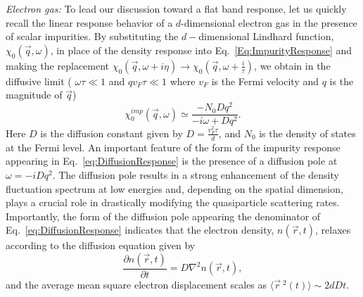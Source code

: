 \documentclass[prl,aps,twocolumn,groupaddress]{revtex4-1}
\begin{document}
\textit{Electron gas:} To lead our discussion toward a flat band response, let us quickly recall the linear response behavior of a $d$-dimensional electron gas in the presence of scalar impurities. By substituting the $d-$dimensional Lindhard function, $\chi_0(\vec q, \omega)$, in place of the density response into Eq.~\ref{Eq:ImpurityResponse} and making the replacement $\chi_0(\vec q, \omega + i\eta) \rightarrow \chi_0(\vec q, \omega + \frac{i}{\tau})$, we obtain in the diffusive limit ( $\omega \tau\ll 1$ and $qv_F \tau \ll 1$ where $v_F$ is the Fermi velocity and $q$ is the magnitude of $\vec q$)~\cite{rammer2004quantum}
\begin{equation}
\chi^{imp}_0(\vec q, \omega) \simeq \frac{-N_0 D q^2}{ - i \omega + D q^2}.
\label{eq:DiffusionResponse}
\end{equation}
Here $D$ is the diffusion constant given by $D = \frac{v_F^2 \tau}{d}$, and $N_0$ is the density of states at the Fermi level. An important feature of the form of the impurity response appearing in Eq.~\ref{eq:DiffusionResponse} is the presence of a diffusion pole at $\omega = -i D q^2$. The diffusion pole results in a strong enhancement of the density fluctuation spectrum at low energies and, depending on the spatial dimension, plays a crucial role in drastically modifying the quasiparticle scattering rates. Importantly, the form of the diffusion pole appearing the denominator of Eq.~\ref{eq:DiffusionResponse} indicates that the electron density, $n(\vec r, t)$, relaxes according to the diffusion equation given by
\begin{equation}
\frac{\partial n(\vec r, t)}{\partial t} = D \nabla^2 n(\vec r, t),
\label{eq:DiffusionEquation}
\end{equation}
and the average mean square electron displacement scales as $\langle \vec r~^2(t) \rangle \sim 2 d D t$. \newline \\ 
\end{document}
